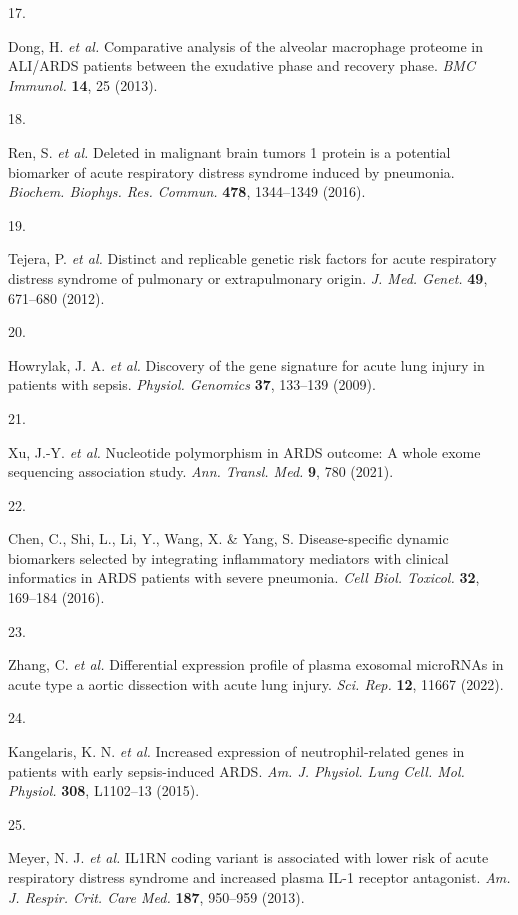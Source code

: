 \documentclass[
  11,
  a4paper,
]{article}
\newlength{\cslhangindent}
\newlength{\csllabelwidth}
\newenvironment{CSLReferences}[2] %
 {\begin{list}{}{%
  \setlength{\itemindent}{0pt}
  \setlength{\leftmargin}{0pt}
  \setlength{\parsep}{0pt}
  \ifodd #1
   \setlength{\leftmargin}{\cslhangindent}
   \setlength{\itemindent}{-1\cslhangindent}
  \fi
  \setlength{\itemsep}{#2\baselineskip}}}
 {\end{list}}
\newcommand{\CSLLeftMargin}[1]{\parbox[t]{\csllabelwidth}{\strut#1\strut}}
\newcommand{\CSLRightInline}[1]{\parbox[t]{\linewidth - \csllabelwidth}{\strut#1\strut}}
\begin{document}
\begin{CSLReferences}{0}{0}
\CSLLeftMargin{17. }%
\CSLRightInline{Dong, H. \emph{et al.} Comparative analysis of the
alveolar macrophage proteome in {ALI/ARDS} patients between the
exudative phase and recovery phase. \emph{BMC Immunol.} \textbf{14}, 25
(2013).}

\CSLLeftMargin{18. }%
\CSLRightInline{Ren, S. \emph{et al.} Deleted in malignant brain tumors
1 protein is a potential biomarker of acute respiratory distress
syndrome induced by pneumonia. \emph{Biochem. Biophys. Res. Commun.}
\textbf{478}, 1344--1349 (2016).}

\CSLLeftMargin{19. }%
\CSLRightInline{Tejera, P. \emph{et al.} Distinct and replicable genetic
risk factors for acute respiratory distress syndrome of pulmonary or
extrapulmonary origin. \emph{J. Med. Genet.} \textbf{49}, 671--680
(2012).}

\CSLLeftMargin{20. }%
\CSLRightInline{Howrylak, J. A. \emph{et al.} Discovery of the gene
signature for acute lung injury in patients with sepsis. \emph{Physiol.
Genomics} \textbf{37}, 133--139 (2009).}

\CSLLeftMargin{21. }%
\CSLRightInline{Xu, J.-Y. \emph{et al.} Nucleotide polymorphism in
{ARDS} outcome: A whole exome sequencing association study. \emph{Ann.
Transl. Med.} \textbf{9}, 780 (2021).}

\CSLLeftMargin{22. }%
\CSLRightInline{Chen, C., Shi, L., Li, Y., Wang, X. \& Yang, S.
Disease-specific dynamic biomarkers selected by integrating inflammatory
mediators with clinical informatics in {ARDS} patients with severe
pneumonia. \emph{Cell Biol. Toxicol.} \textbf{32}, 169--184 (2016).}

\CSLLeftMargin{23. }%
\CSLRightInline{Zhang, C. \emph{et al.} Differential expression profile
of plasma exosomal {microRNAs} in acute type a aortic dissection with
acute lung injury. \emph{Sci. Rep.} \textbf{12}, 11667 (2022).}

\CSLLeftMargin{24. }%
\CSLRightInline{Kangelaris, K. N. \emph{et al.} Increased expression of
neutrophil-related genes in patients with early sepsis-induced {ARDS}.
\emph{Am. J. Physiol. Lung Cell. Mol. Physiol.} \textbf{308}, L1102--13
(2015).}

\CSLLeftMargin{25. }%
\CSLRightInline{Meyer, N. J. \emph{et al.} {IL1RN} coding variant is
associated with lower risk of acute respiratory distress syndrome and
increased plasma {IL-1} receptor antagonist. \emph{Am. J. Respir. Crit.
Care Med.} \textbf{187}, 950--959 (2013).}


\end{CSLReferences}
\end{document}
